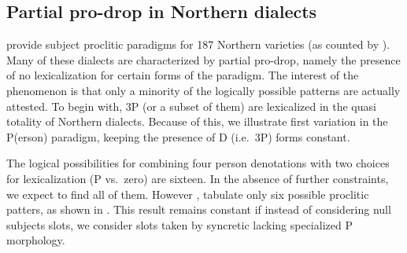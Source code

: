 \documentclass[output=paper]{langsci/langscibook}
\begin{document}
\subsection{Partial pro-drop in Northern 
dialects}\label{sec:06.2.1}

\textcite[§2.3]{ManziniSavoia2005} provide subject proclitic paradigms for 187
Northern  varieties (as counted by \citealt{Calabrese2008}). Many
of these dialects are characterized by partial pro-drop,
namely the presence of no lexicalization for certain forms of the paradigm. The
interest of the phenomenon is that only a minority of the logically possible
patterns are actually attested. To begin with, 3P  (or a subset of
them) are lexicalized in the quasi totality of Northern  dialects.
Because of this, we illustrate first variation in the P(erson) paradigm,
keeping the presence of D (i.e.\ 3P) forms constant.

The logical possibilities for combining four person denotations with two\linebreak
choices for lexicalization (P vs.\ zero) are sixteen. In the absence of further
constraints, we expect to find all of them. However \citet{ManziniSavoia2005},
\citet{Manzini2015b} tabulate only six possible proclitic patters, as shown in
. This result remains constant if instead of considering null
subjects slots, we consider slots taken by syncretic  lacking
specialized P morphology.
\end{document}
